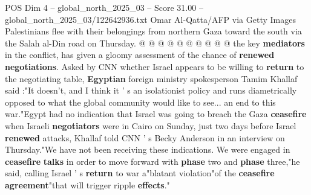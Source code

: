 \begin{textsample}{POS Dim 4 – global\_north\_2025\_03 – Score 31.00 – global\_north\_2025\_03/122642936.txt}
Omar Al-Qatta/AFP via Getty Images Palestinians flee with their belongings from northern Gaza toward the south via the Salah al-Din road on Thursday. @ @ @ @ @ @ @ @ @ @ the key \textbf{mediators} in the conflict, has given a gloomy assessment of the chance of \textbf{renewed} \textbf{negotiations}.
Asked by CNN whether Israel appears to be willing to \textbf{return} to the negotiating table, \textbf{Egyptian} foreign ministry spokesperson Tamim Khallaf said :"It doesn't, and I think it ' s an isolationist policy and runs diametrically opposed to what the global community would like to see... an end to this war."Egypt had no indication that Israel was going to breach the Gaza \textbf{ceasefire} when Israeli \textbf{negotiators} were in Cairo on Sunday, just two days before Israel \textbf{renewed} attacks, Khallaf told CNN ' s Becky Anderson in an interview on Thursday."We have not been receiving these indications.
We were engaged in \textbf{ceasefire} \textbf{talks} in order to move forward with \textbf{phase} two and \textbf{phase} three,"he said, calling Israel ' s \textbf{return} to war a"blatant violation"of the \textbf{ceasefire} \textbf{agreement}"that will trigger ripple \textbf{effects}."

\end{textsample}
